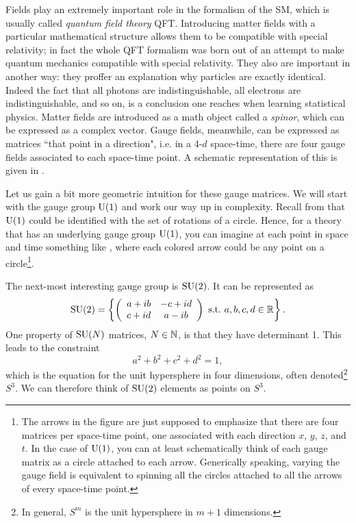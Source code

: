 Fields play an extremely important role in the formalism of the SM, which is
usually called {\it quantum field theory} QFT. Introducing matter fields with a
particular mathematical structure allows them to be compatible with special
relativity; in fact the whole QFT formalism was born out of an attempt to make
quantum mechanics compatible with special relativity. They also are important in
another way: they proffer an explanation why particles are exactly identical.
Indeed the fact that all photons are indistinguishable, all electrons are
indistinguishable, and so on, is a conclusion one reaches when learning
statistical physics.
Matter fields are introduced as a math object called a {\it spinor}, which can
be expressed as a complex vector. Gauge fields, meanwhile, can be expressed as
matrices ``that point in a direction", i.e. in a 4-$d$ space-time, there are
four gauge fields associated to each space-time point. A schematic
representation of this is given in .

Let us gain a bit more geometric intuition for these gauge matrices. We will
start with the gauge group $\operatorname{U}(1)$ and work our way up in complexity.
Recall from  that $\operatorname{U}(1)$ could be identified with the
set of rotations of a circle. Hence, for a theory that has an underlying gauge
group $\operatorname{U}(1)$, you can imagine at each point in space and time something
like , where each colored arrow could be any point on a
circle\footnote{The arrows in the figure are just supposed to emphasize that
there are four matrices per space-time point, one associated with each direction
$x$, $y$, $z$, and $t$. In the case of $\operatorname{U}(1)$, you can at least schematically
think of each gauge matrix as a circle attached to each arrow. Generically
speaking, varying the gauge field is equivalent to spinning all the circles
attached to all the arrows of every space-time point.}.

The next-most interesting gauge group is $\operatorname{SU}(2)$. It can be represented as
\begin{equation}
\operatorname{SU}(2)=\left\{
\left(\begin{array}{cc}
          a+ib   & -c+id  \\
          c+id   &  a-ib  \\
            \end{array}\right)~\text{s.t.}~ a,b,c,d\in\mathbb{R} \right\}.
\end{equation} 
One property of $\operatorname{SU}(N)$ matrices, $N\in\mathbb{N}$, is that they have determinant 1.
This leads to the constraint
\begin{equation}
a^2+b^2+c^2+d^2=1,
\end{equation}
which is the equation for the unit hypersphere in four dimensions, often 
denoted\footnote{In general, $S^m$ is the unit hypersphere in $m+1$ dimensions.}
$S^3$. We can therefore think of $\operatorname{SU}(2)$ elements as points on $S^3$.

